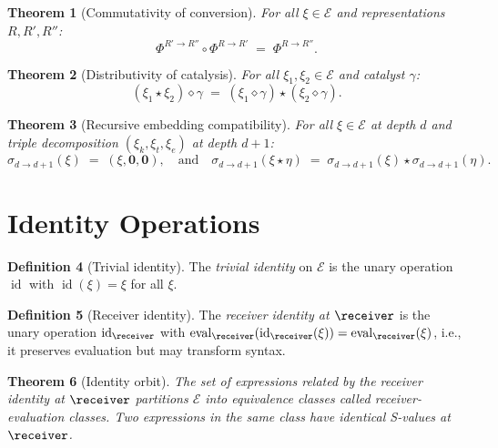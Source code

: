 \documentclass[11pt,a4paper]{article}
\theoremstyle{thmstyle}
\newtheorem{theorem}{Theorem}[section]
\theoremstyle{thmstyle}
\theoremstyle{definition}
\newtheorem{definition}[theorem]{Definition}
\theoremstyle{remark}
\DeclareMathOperator{\id}{id}
\DeclareMathOperator{\eval}{eval}
\newcommand{\Expr}{\mathcal{E}}
\begin{document}
\begin{theorem}[Commutativity of conversion]
\label{thm:comm-conv}
For all $\xi \in \Expr$ and representations
$R, R', R''$:
\[
\Phi^{R' \to R''} \circ \Phi^{R \to R'}
\;=\; \Phi^{R \to R''}.
\]
\end{theorem}

\begin{theorem}[Distributivity of catalysis]
\label{thm:dist-cat}
For all $\xi_{1}, \xi_{2} \in \Expr$ and catalyst
$\gamma$:
\[
(\xi_{1} \star \xi_{2}) \diamond \gamma
\;=\; (\xi_{1} \diamond \gamma) \star
        (\xi_{2} \diamond \gamma).
\]
\end{theorem}

\begin{theorem}[Recursive embedding compatibility]
\label{thm:rec-embed-compat}
For all $\xi \in \Expr$ at depth $d$ and triple
decomposition $(\xi_{k}, \xi_{t}, \xi_{e})$ at
depth $d+1$:
\[
\sigma_{d \to d+1}(\xi)
\;=\; (\xi, \mathbf{0}, \mathbf{0}),
\quad \text{and}\quad
\sigma_{d \to d+1}(\xi \star \eta)
\;=\; \sigma_{d \to d+1}(\xi) \star
       \sigma_{d \to d+1}(\eta).
\]
\end{theorem}

\section{Identity Operations}
\label{sec:identity-ops}

\begin{definition}[Trivial identity]\label{def:triv-id}
The \emph{trivial identity} on $\Expr$ is the unary
operation $\id$ with $\id(\xi) = \xi$ for all
$\xi$.
\end{definition}

\begin{definition}[Receiver identity]\label{def:rec-id}
The \emph{receiver identity at $\receiver$} is the
unary operation $\id_{\receiver}$ with
$\eval_{\receiver}(\id_{\receiver}(\xi)) =
\eval_{\receiver}(\xi)$, i.e., it preserves
evaluation but may transform syntax.
\end{definition}

\begin{theorem}[Identity orbit]\label{thm:id-orbit}
The set of expressions related by the receiver
identity at $\receiver$ partitions $\Expr$ into
equivalence classes called
\emph{receiver-evaluation classes}.  Two expressions
in the same class have identical S-values at
$\receiver$.
\end{theorem}
\end{document}
